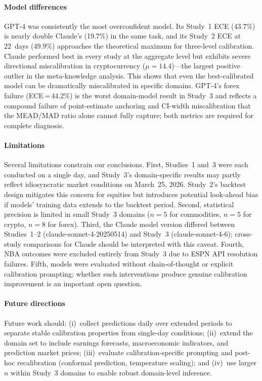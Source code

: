 \paragraph{Model differences} GPT-4 was consistently the most overconfident
model. Its Study~1 ECE (43.7\%) is nearly double Claude's (19.7\%) in the
same task, and its Study~2 ECE at 22~days (49.9\%) approaches the theoretical
maximum for three-level calibration. Claude performed best in every study at
the aggregate level but exhibits severe directional miscalibration in
cryptocurrency ($\mu = 14.4$)---the largest positive outlier in the
meta-knowledge analysis. This shows that even the best-calibrated model
can be dramatically miscalibrated in specific domains. GPT-4's forex failure
(ECE\,=\,44.2\%) is the worst domain-model result in Study~3 and reflects a
compound failure of point-estimate anchoring and CI-width miscalibration that
the MEAD/MAD ratio alone cannot fully capture; both metrics are required for
complete diagnosis.

\paragraph{Limitations} Several limitations constrain our conclusions.
First, Studies~1 and~3 were each conducted on a single day, and Study~3's
domain-specific results may partly reflect idiosyncratic market conditions
on March~25, 2026. Study~2's backtest design mitigates this concern for
equities but introduces potential look-ahead bias if models' training data
extends to the backtest period. Second, statistical precision is limited in
small Study~3 domains ($n = 5$ for commodities, $n = 5$ for crypto,
$n = 8$ for forex). Third, the Claude model version differed between
Studies~1--2 (claude-sonnet-4-20250514) and Study~3 (claude-sonnet-4-6);
cross-study comparisons for Claude should be interpreted with this caveat.
Fourth, NBA outcomes were excluded entirely from Study~3 due to ESPN API
resolution failures. Fifth, models were evaluated without chain-of-thought
or explicit calibration prompting; whether such interventions produce genuine
calibration improvement is an important open question.

\paragraph{Future directions} Future work should: (i)~collect predictions
daily over extended periods to separate stable calibration properties from
single-day conditions; (ii)~extend the domain set to include earnings
forecasts, macroeconomic indicators, and prediction market prices;
(iii)~evaluate calibration-specific prompting and post-hoc recalibration
(conformal prediction, temperature scaling); and (iv)~use larger $n$ within
Study~3 domains to enable robust domain-level inference.


